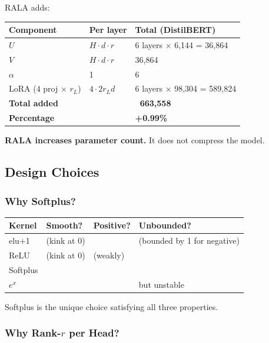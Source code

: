 RALA adds:

\begin{table}[H]
\centering
\small
\begin{tabular}{lll}
\toprule
\textbf{Component} & \textbf{Per layer} & \textbf{Total (DistilBERT)} \\
\midrule
$U$ & $H \cdot d \cdot r$ & 6 layers $\times$ 6,144 = 36,864 \\
$V$ & $H \cdot d \cdot r$ & 36,864 \\
$\alpha$ & 1 & 6 \\
LoRA ($4$ proj $\times$ $r_L$) & $4 \cdot 2 r_L d$ & 6 layers $\times$ 98,304 = 589,824 \\
\textbf{Total added} &  & \textbf{~663,558} \\
\textbf{Percentage} &  & \textbf{+0.99\%} \\
\bottomrule
\end{tabular}
\end{table}

\textbf{RALA increases parameter count.} It does not compress the model.

\subsection{Design Choices}

\subsubsection{Why Softplus?}

\begin{table}[H]
\centering
\small
\begin{tabular}{llll}
\toprule
\textbf{Kernel} & \textbf{Smooth?} & \textbf{Positive?} & \textbf{Unbounded?} \\
\midrule
elu+1 & (kink at 0) &  & (bounded by 1 for negative) \\
ReLU & (kink at 0) & (weakly) &  \\
Softplus &  &  &  \\
$e^x$ &  &  & but unstable \\
\bottomrule
\end{tabular}
\end{table}

Softplus is the unique choice satisfying all three properties.

\subsubsection{Why Rank-$r$ per Head?}

